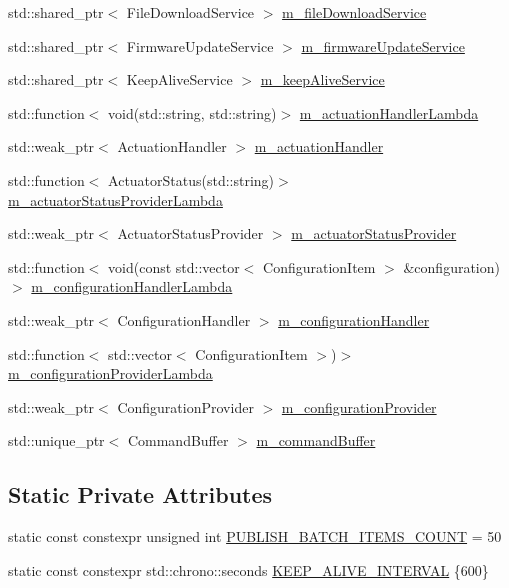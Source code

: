 \begin{DoxyCompactItemize}
\item 
std\+::shared\+\_\+ptr$<$ File\+Download\+Service $>$ \hyperlink{classwolkabout_1_1_wolk_ab52986b0cbb0939f51f8f8d4d45dfab0}{m\+\_\+file\+Download\+Service}
\item 
std\+::shared\+\_\+ptr$<$ Firmware\+Update\+Service $>$ \hyperlink{classwolkabout_1_1_wolk_aa26f2abac76d31fd3a13f56cf5f8b20d}{m\+\_\+firmware\+Update\+Service}
\item 
std\+::shared\+\_\+ptr$<$ Keep\+Alive\+Service $>$ \hyperlink{classwolkabout_1_1_wolk_a03e41fa47eb856bfaab0adfc5e90770c}{m\+\_\+keep\+Alive\+Service}
\item 
std\+::function$<$ void(std\+::string, std\+::string)$>$ \hyperlink{classwolkabout_1_1_wolk_a0e261d8a574948ab3bed814de0a571da}{m\+\_\+actuation\+Handler\+Lambda}
\item 
std\+::weak\+\_\+ptr$<$ Actuation\+Handler $>$ \hyperlink{classwolkabout_1_1_wolk_a5995d8743c22d508c4dbba6e652f1244}{m\+\_\+actuation\+Handler}
\item 
std\+::function$<$ Actuator\+Status(std\+::string)$>$ \hyperlink{classwolkabout_1_1_wolk_a357c76819475203ea44f0deceb82f3bf}{m\+\_\+actuator\+Status\+Provider\+Lambda}
\item 
std\+::weak\+\_\+ptr$<$ Actuator\+Status\+Provider $>$ \hyperlink{classwolkabout_1_1_wolk_a77da2ea8914c67af1417b39b8c19b928}{m\+\_\+actuator\+Status\+Provider}
\item 
std\+::function$<$ void(const std\+::vector$<$ Configuration\+Item $>$ \&configuration)$>$ \hyperlink{classwolkabout_1_1_wolk_ae47e78eeb1e265a999014209d7bf15df}{m\+\_\+configuration\+Handler\+Lambda}
\item 
std\+::weak\+\_\+ptr$<$ Configuration\+Handler $>$ \hyperlink{classwolkabout_1_1_wolk_a662b0a47eb325a676adaf7bdd07a9c4d}{m\+\_\+configuration\+Handler}
\item 
std\+::function$<$ std\+::vector$<$ Configuration\+Item $>$)$>$ \hyperlink{classwolkabout_1_1_wolk_a0b022ee57d9ae6101b2868828e24b8c1}{m\+\_\+configuration\+Provider\+Lambda}
\item 
std\+::weak\+\_\+ptr$<$ Configuration\+Provider $>$ \hyperlink{classwolkabout_1_1_wolk_a31588377251dadbb584911fb30e9fe5d}{m\+\_\+configuration\+Provider}
\item 
std\+::unique\+\_\+ptr$<$ Command\+Buffer $>$ \hyperlink{classwolkabout_1_1_wolk_a84181505958620f03aa65303362c4103}{m\+\_\+command\+Buffer}
\end{DoxyCompactItemize}
\subsection*{Static Private Attributes}
\begin{DoxyCompactItemize}
\item 
static const constexpr unsigned int \hyperlink{classwolkabout_1_1_wolk_a4546eac23e520d87ab3e335740a044f3}{P\+U\+B\+L\+I\+S\+H\+\_\+\+B\+A\+T\+C\+H\+\_\+\+I\+T\+E\+M\+S\+\_\+\+C\+O\+U\+NT} = 50
\item 
static const constexpr std\+::chrono\+::seconds \hyperlink{classwolkabout_1_1_wolk_a0baa96b788266a9f9b164cd2e8799e73}{K\+E\+E\+P\+\_\+\+A\+L\+I\+V\+E\+\_\+\+I\+N\+T\+E\+R\+V\+AL} \{600\}
\end{DoxyCompactItemize}
